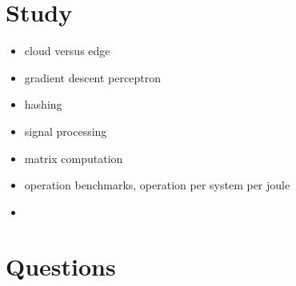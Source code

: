 \documentclass[main.tex]{subfiles}
\begin{document}
\section{Study}

\begin{itemize}
\item cloud versus edge
\item gradient descent
\itme perceptron
\item hashing
\item signal processing
\item matrix computation
\item operation benchmarks, operation per system per joule
\item 
\end{itemize}

\section{Questions}
\end{document}
